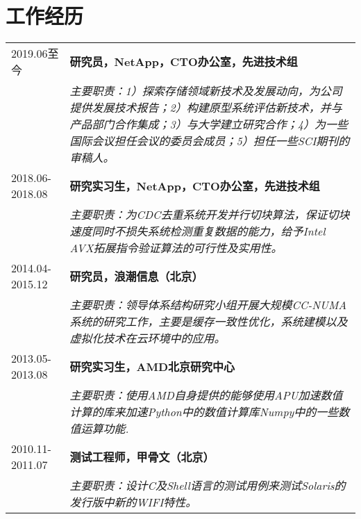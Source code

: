 \documentclass{article}
\begin{document}
 
\section{工作经历}

    \begin{tabular}{lp{15cm}}
         2019.06至今 & \bf{研究员，NetApp，CTO办公室，先进技术组} \\
         & \small{\it 主要职责：1）探索存储领域新技术及发展动向，为公司提供发展技术报告；2）构建原型系统评估新技术，并与产品部门合作集成；3）与大学建立研究合作；4）为一些国际会议担任会议的委员会成员；5）担任一些SCI期刊的审稿人。}\\
         2018.06-2018.08 & \bf{研究实习生，NetApp，CTO办公室，先进技术组}\\
         & \small{\it 主要职责：为CDC去重系统开发并行切块算法，保证切块速度同时不损失系统检测重复数据的能力，给予Intel AVX拓展指令验证算法的可行性及实用性。}\\
         2014.04-2015.12 &\bf{研究员，浪潮信息（北京）}\\
         & \small{\it 主要职责：领导体系结构研究小组开展大规模CC-NUMA系统的研究工作，主要是缓存一致性优化，系统建模以及虚拟化技术在云环境中的应用。 }\\
         2013.05-2013.08 & \bf {研究实习生，AMD北京研究中心}\\
         &\small{\it 主要职责：使用AMD自身提供的能够使用APU加速数值计算的库来加速Python中的数值计算库Numpy中的一些数值运算功能.}\\
         2010.11-2011.07 & \bf{测试工程师，甲骨文（北京）} \\
         &\small{\it 主要职责：设计C及Shell语言的测试用例来测试Solaris的发行版中新的WIFI特性。}
    \end{tabular}
\end{document}
